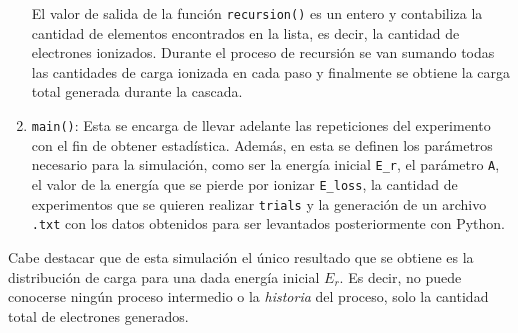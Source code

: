 \begin{enumerate}[label=\arabic*., listparindent=1.5em]
    \indent El valor de salida de la función \verb|recursion()| es un entero y contabiliza la cantidad de elementos encontrados en la lista, es decir, la cantidad de electrones ionizados. Durante el proceso de recursión se van sumando todas las cantidades de carga ionizada en cada paso y finalmente se obtiene la carga total generada durante la cascada.
    \item \verb|main()|: Esta se encarga de llevar adelante las repeticiones del experimento con el fin de obtener estadística. Además, en esta se definen los parámetros necesario para la simulación, como ser la energía inicial \verb|E_r|, el parámetro \verb|A|, el valor de la energía que se pierde por ionizar \verb|E_loss|, la cantidad de experimentos que se quieren realizar \verb|trials| y la generación de un archivo \verb|.txt| con los datos obtenidos para ser levantados posteriormente con Python.
\end{enumerate}
Cabe destacar que de esta simulación el único resultado que se obtiene es la distribución de carga para una dada energía inicial $E_{r}$. Es decir, no puede conocerse ningún proceso intermedio o la \textit{historia} del proceso, solo la cantidad total de electrones generados.